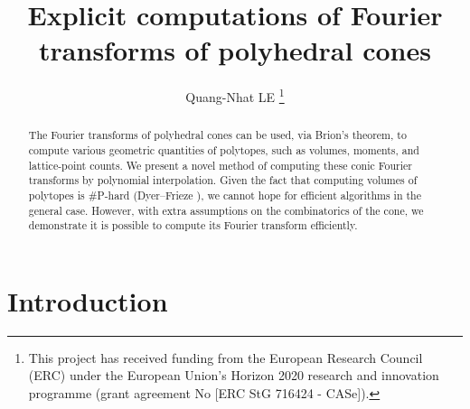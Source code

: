 \documentclass{article}
\begin{document}
\title{Explicit computations of Fourier transforms of polyhedral cones}
\author{Quang-Nhat LE
\thanks{This project has received funding from the European Research Council (ERC) under the European Union's Horizon 2020 research and innovation programme (grant agreement No [ERC StG 716424 - CASe]).}
}

\maketitle

\begin{abstract}
The Fourier transforms of polyhedral cones can be used, via Brion’s theorem, to compute various geometric quantities of polytopes, such as volumes, moments, and lattice-point counts. We present a novel method of computing these conic Fourier transforms by polynomial interpolation. Given the fact that computing volumes of polytopes is \#P-hard (Dyer--Frieze \cite{dyer1988complexity}), we cannot hope for efficient algorithms in the general case. However, with extra assumptions on the combinatorics of the cone, we demonstrate it is possible to compute its Fourier transform efficiently.
\end{abstract}

\section{Introduction}
\end{document}
